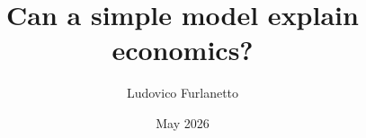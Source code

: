 \title{Can a simple model explain economics?}
\author{Ludovico Furlanetto}
\date{May 2026}

\newcommand{\abstracttext}{%
Probably not%
}
